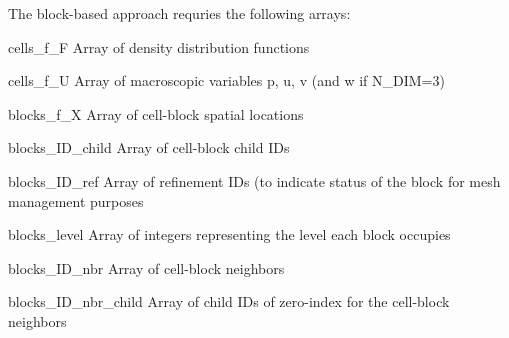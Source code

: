 The block-\/based approach requries the following arrays\+:
\begin{DoxyItemize}
\item cells\+\_\+f\+\_\+F Array of density distribution functions
\item cells\+\_\+f\+\_\+U Array of macroscopic variables p, u, v (and w if N\+\_\+\+D\+IM=3)
\item blocks\+\_\+f\+\_\+X Array of cell-\/block spatial locations
\item blocks\+\_\+\+I\+D\+\_\+child Array of cell-\/block child I\+Ds
\item blocks\+\_\+\+I\+D\+\_\+ref Array of refinement I\+Ds (to indicate status of the block for mesh management purposes
\item blocks\+\_\+level Array of integers representing the level each block occupies
\item blocks\+\_\+\+I\+D\+\_\+nbr Array of cell-\/block neighbors
\item blocks\+\_\+\+I\+D\+\_\+nbr\+\_\+child Array of child I\+Ds of zero-\/index for the cell-\/block neighbors
\end{DoxyItemize}

